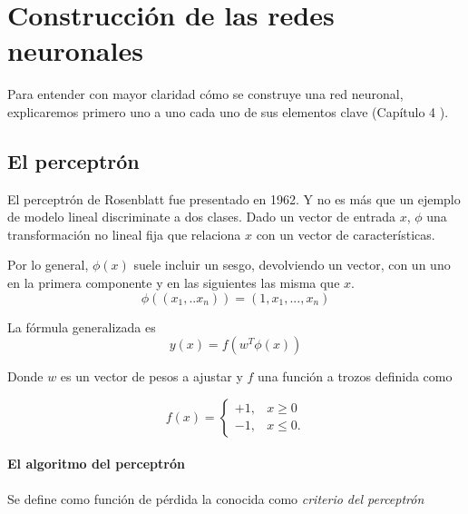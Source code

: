 %

\chapter{Construcción de las redes neuronales}  

Para entender con mayor claridad cómo se construye una red neuronal, explicaremos primero 
uno a uno cada uno de sus elementos clave 
(Capítulo 4 \cite{BishopPaterRecognition}).

\section{El perceptrón}  

El perceptrón de Rosenblatt fue presentado en 1962. 
Y no es más que un ejemplo de modelo lineal 
discriminate a dos clases.
Dado un vector de entrada $x$, 
$\phi$ una transformación no lineal fija que relaciona
$x$ con un vector de características. 

Por lo general, $\phi(x)$ suele incluir un sesgo, 
devolviendo un vector, con un uno en la primera componente y en las siguientes las misma que $x$. 
\begin{equation}
    \phi((x_1,..x_n)) = (1, x_1, ..., x_n)
\end{equation} 

La fórmula generalizada es 
\begin{equation}
    y(x) = f(w^T \phi(x))
\end{equation}

Donde $w$ es un vector de pesos a ajustar y 
$f$ una función a trozos definida como 

\begin{equation}
    f(x) =
    \left\{ 
        \begin{aligned}
        +1, & x \geq 0
            \\
            -1, & x \leq 0.
        \end{aligned}
    \right .  
\end{equation}

\subsubsection{El algoritmo del perceptrón}

Se define como función de pérdida la conocida como 
\textit{criterio del perceptrón}

